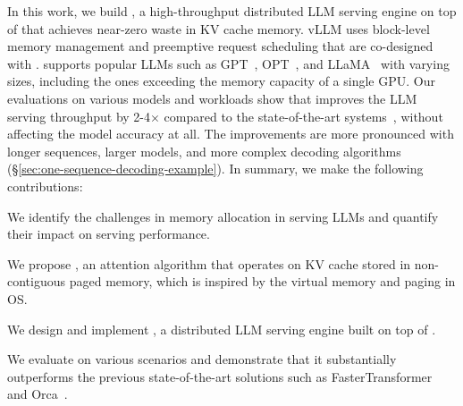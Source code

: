 In this work, we build \emph{\sys}, a high-throughput distributed LLM serving engine on top of \tech that achieves near-zero waste in KV cache memory.
vLLM uses block-level memory management and preemptive request scheduling that are co-designed with \tech.
\sys supports popular LLMs such as GPT~\cite{brown2020language}, OPT~\cite{zhang2022opt}, and LLaMA~\cite{touvron2023llama} with varying sizes, including the ones exceeding the memory capacity of a single GPU.
Our evaluations on various models and workloads show that \sys improves the LLM serving throughput by 2-4$\times$ compared to the state-of-the-art systems~\cite{yu2022orca,nvidiaft}, without affecting the model accuracy at all.
The improvements are more pronounced with longer sequences, larger models, and more complex decoding algorithms (\S\ref{sec:one-sequence-decoding-example}).
In summary, we make the following contributions:
\begin{CompactItemize}
    \item We identify the challenges in memory allocation in serving LLMs and quantify their impact on serving performance.
    \item We propose \tech, an attention algorithm that operates on KV cache stored in non-contiguous paged memory, which is inspired by the virtual memory and paging in OS.
    \item We design and implement \sys, a distributed LLM serving engine built on top of \tech.
    \item We evaluate \sys on various scenarios and demonstrate that it substantially outperforms the previous state-of-the-art solutions such as FasterTransformer~\cite{nvidiaft} and Orca~\cite{yu2022orca}.
\end{CompactItemize}
